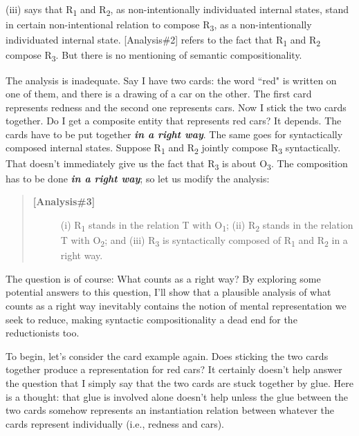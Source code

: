 \documentclass[a4paper,12pt]{article}
\begin{document}
(iii) says that R\textsubscript{1} and R\textsubscript{2}, as non-intentionally individuated internal states, stand in certain non-intentional relation to compose R\textsubscript{3}, as a non-intentionally individuated internal state. [Analysis\#2] refers to the fact that R\textsubscript{1} and R\textsubscript{2} compose R\textsubscript{3}. But there is no mentioning of semantic compositionality.

The analysis is inadequate. Say I have two cards: the word ``red" is written on one of them, and there is a drawing of a car on the other. The first card represents redness and the second one represents cars. Now I stick the two cards together. Do I get a composite entity that represents red cars? It depends. The cards have to be put together \emph{\textbf{in a right way}}. \footnotemark The same goes for syntactically composed internal states. Suppose R\textsubscript{1} and R\textsubscript{2} jointly compose R\textsubscript{3} syntactically. That doesn't immediately give us the fact that R\textsubscript{3} is about O\textsubscript{3}. The composition has to be done \emph{\textbf{in a right way}}; so let us modify the analysis:


\begin{quote}
\begin{description}
\item[\textbf{[Analysis\#3]}] (i) R\textsubscript{1} stands in the relation T with O\textsubscript{1}; (ii) R\textsubscript{2} stands in the relation T with O\textsubscript{2}; and (iii) R\textsubscript{3} is syntactically composed of R\textsubscript{1} and R\textsubscript{2} in a right way.
\end{description}
\end{quote}

The question is of course: What counts as a right way? By exploring some potential answers to this question, I'll show that a plausible analysis of what counts as a right way inevitably contains the notion of mental representation we seek to reduce, making syntactic compositionality a dead end for the reductionists too.

To begin, let's consider the card example again. Does sticking the two cards together produce a representation for red cars? It certainly doesn't help answer the question that I simply say that the two cards are stuck together by glue. Here is a thought: that glue is involved alone doesn't help unless the glue between the two cards somehow represents an instantiation relation between whatever the cards represent individually (i.e., redness and cars).
\end{document}
